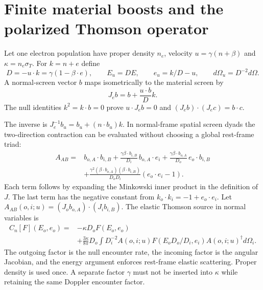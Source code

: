 \section{Finite material boosts and the polarized Thomson operator}

Let one electron population have proper density $n_e$, velocity $u=\gamma(n+\beta)$ and $\kappa=n_e\sigma_T$. For $k=n+e$ define
\begin{equation}
 D=-u\cdot k=\gamma(1-\beta\cdot e),\qquad
 E_u=DE,\qquad e_u=k/D-u,\qquad d\Omega_u=D^{-2}d\Omega.
 \label{ii:doppler}
\end{equation}
A normal-screen vector $b$ maps isometrically to the material screen by
\begin{equation}
 J_eb=b+\frac{u\cdot b}{D}k.
 \label{ii:screen_boost}
\end{equation}
The null identities $k^2=k\cdot b=0$ prove $u\cdot J_eb=0$ and $(J_eb)\cdot(J_ec)=b\cdot c$.

The inverse is $J_e^{-1}b_u=b_u+(n\cdot b_u)k$. In normal-frame spatial screen dyads the two-direction contraction can be evaluated without choosing a global rest-frame triad:
\begin{align}
 A_{AB}={}&b_{o,A}\cdot b_{i,B}
 +\frac{\gamma\beta\cdot b_{i,B}}{D_i}\,b_{o,A}\cdot e_i
 +\frac{\gamma\beta\cdot b_{o,A}}{D_o}\,e_o\cdot b_{i,B}\nonumber\\
 &+\frac{\gamma^2(\beta\cdot b_{o,A})(\beta\cdot b_{i,B})}{D_oD_i}
       (e_o\cdot e_i-1).
 \label{ii:explicit_screen_kernel}
\end{align}
Each term follows by expanding the Minkowski inner product in the definition of $J$. The last term has the negative constant from $k_o\cdot k_i=-1+e_o\cdot e_i$.
 Let $A_{AB}(o,i;u)=(J_ob_{o,A})\cdot(J_ib_{i,B})$. The elastic Thomson source in normal variables is
\begin{align}
 C_n[F](E_o,e_o)={}&-\kappa D_oF(E_o,e_o)\nonumber\\
 &+\frac{3\kappa}{8\pi}D_o\int D_i^{-2}A(o,i;u)
 F(E_oD_o/D_i,e_i)A(o,i;u)^\dagger d\Omega_i.
 \label{ii:boosted_thomson}
\end{align}
The outgoing factor is the null encounter rate, the incoming factor is the angular Jacobian, and the energy argument enforces rest-frame elastic scattering. Proper density is used once. A separate factor $\gamma$ must not be inserted into $\kappa$ while retaining the same Doppler encounter factor.


